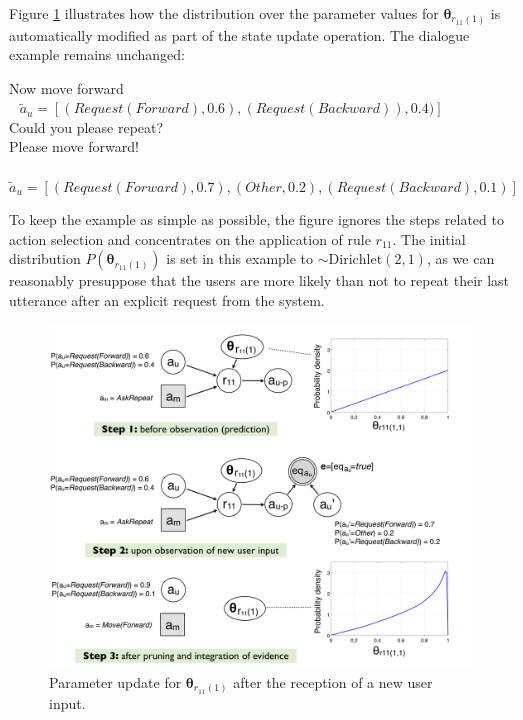 Figure \ref{fig:learningexample} illustrates how the distribution over the parameter values for $\boldsymbol\theta_{r_{11}(1)}$ is automatically modified as part of the state update operation.  The dialogue example remains unchanged:
\begin{dialogue} 
 Now move forward \\ $\phantom{b}$ $\tilde{a}_u = [ (\mathit{Request(Forward)}, 0.6), (\mathit{Request(Backward)}), 0.4)]$  \\[-3mm]
 Could you please repeat? \\[-3mm]
 Please move forward! \\ $\phantom{b}$ $\tilde{a}_u = [ (\mathit{Request(Forward)}, 0.7), (\mathit{Other}, 0.2), (\mathit{Request(Backward)}, 0.1) ]$ \\[-4mm]
\end{dialogue} 

To keep the example as simple as possible, the figure ignores the steps related to action selection and concentrates on the application of rule $r_{11}$.  The initial distribution $P(\boldsymbol\theta_{r_{11}(1)})$ is set in this example to $\sim \mathrm{Dirichlet}(2,1)$, as we can reasonably presuppose that the users are more likely than not to repeat their last utterance after an explicit request from the system.

\begin{figure}[h]
\centering
\includegraphics[scale=0.30]{imgs/learningexample.pdf}
\caption{Parameter update for $\boldsymbol\theta_{r_{11}(1)}$ after the reception of a new user input. }
\label{fig:learningexample}
\end{figure}

